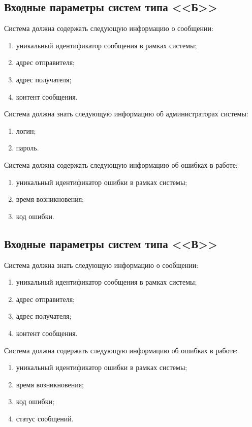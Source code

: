 \subsection{Входные параметры систем типа <<Б>>}

Система должна содержать следующую информацию о сообщении:
\begin{enumerate}
	\item уникальный идентификатор сообщения в рамках системы;
	\item адрес отправителя;
	\item адрес получателя;
	\item контент сообщения.
\end{enumerate}

Система должна знать следующую информацию об администраторах системы:
\begin{enumerate}
	\item логин;
	\item пароль.
\end{enumerate}

Система должна содержать следующую информацию об ошибках в работе:
\begin{enumerate}
	\item уникальный идентификатор ошибки в рамках системы;
	\item время возникновения;
	\item код ошибки.
\end{enumerate}

\subsection{Входные параметры систем типа <<В>>}
Система должна знать следующую информацию о сообщении:
\begin{enumerate}
	\item уникальный идентификатор сообщения в рамках системы;
	\item адрес отправителя;
	\item адрес получателя;
	\item контент сообщения.
\end{enumerate}

Система должна содержать следующую информацию об ошибках в работе:
\begin{enumerate}
	\item уникальный идентификатор ошибки в рамках системы;
	\item время возникновения;
	\item код ошибки;
	\item статус сообщений.
\end{enumerate}


